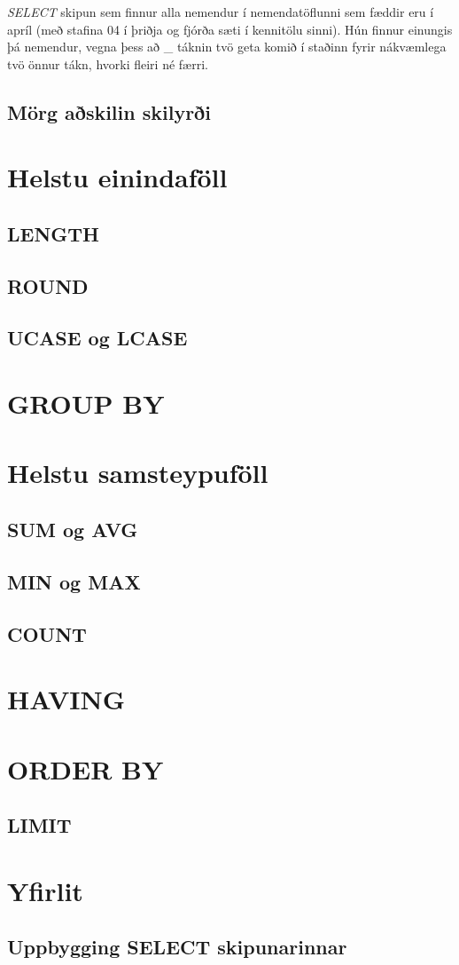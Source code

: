 \begin{example}
\caption[LIKE með nákvæmum stafafjölda]{\emph{SELECT} skipun sem finnur alla nemendur í nemendatöflunni sem fæddir eru í apríl (með stafina 04 í þriðja og fjórða sæti í kennitölu sinni). Hún finnur einungis þá nemendur, vegna þess að \_ táknin tvö geta komið í staðinn fyrir nákvæmlega tvö önnur tákn, hvorki fleiri né færri.}
\label{sql:k4d12-like-kennitala}
\centering
{}
\end{example}
\subsection{Mörg aðskilin skilyrði} %

\section{Helstu einindaföll}
\label{undirkafli:einindafoll}
\subsection{LENGTH}
\subsection{ROUND}
\subsection{UCASE og LCASE}
\section{GROUP BY}
\section{Helstu samsteypuföll}
\subsection{SUM og AVG}
\subsection{MIN og MAX}
\subsection{COUNT}
\section{HAVING}
\section{ORDER BY}
\subsection{LIMIT}
\section{Yfirlit}
\subsection{Uppbygging SELECT skipunarinnar}